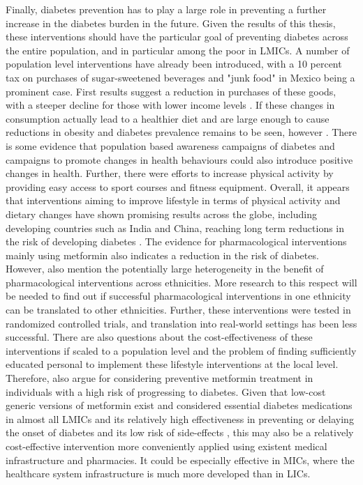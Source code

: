Finally, diabetes prevention has to play a large role in preventing a further increase in the diabetes burden in the future. Given the results of this thesis, these interventions should have the particular goal of preventing diabetes across the entire population, and in particular among the poor in \acp{LMIC}. A number of population level interventions have already been introduced, with a 10 percent tax on purchases of sugar-sweetened beverages and "junk food" in Mexico being a prominent case. First results suggest a reduction in purchases of these goods, with a steeper decline for those with lower income levels \parencite{Colchero2016,Batis2016}. If these changes in consumption actually lead to a healthier diet and are large enough to cause reductions in obesity and diabetes prevalence remains to be seen, however \parencite{Singh2016}. There is some evidence that population based awareness campaigns of diabetes and campaigns to promote changes in health behaviours could also introduce positive changes in health. Further, there were efforts to increase physical activity by providing easy access to sport courses and fitness equipment. Overall, it appears that interventions aiming to improve lifestyle in terms of physical activity and dietary changes have shown promising results across the globe, including developing countries such as India and China, reaching long term reductions in the risk of developing diabetes \parencite{Cefalu2016}. The evidence for pharmacological interventions mainly using metformin also indicates a reduction in the risk of diabetes. However, \textcite{Cefalu2016} also mention the potentially large heterogeneity in the benefit of pharmacological interventions across ethnicities. More research to this respect will be needed to find out if successful pharmacological interventions in one ethnicity can be translated to other ethnicities. Further, these interventions were tested in randomized controlled trials, and translation into real-world settings has been less successful. There are also questions about the cost-effectiveness of these interventions if scaled to a population level and the problem of finding sufficiently educated personal to implement these lifestyle interventions at the local level. Therefore, \textcite{Cefalu2016} also argue for considering preventive metformin treatment in individuals with a high risk of progressing to diabetes. Given that low-cost generic versions of metformin exist and considered essential diabetes medications in almost all \acp{LMIC} \parencite{Bazargani2014} and its relatively high effectiveness in preventing or delaying the onset of diabetes and its low risk of side-effects \parencite{Gomes2013}, this may also be a relatively cost-effective intervention more conveniently applied using existent medical infrastructure and pharmacies. It could be especially effective in \acp{MIC}, where the healthcare system infrastructure is much more developed than in \acp{LIC}.


